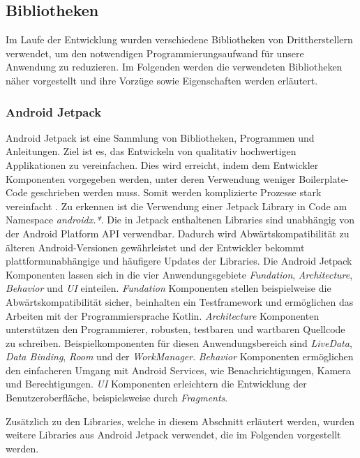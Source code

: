 \documentclass[a4paper]{article}
\begin{document}
\subsection{Bibliotheken}
\label{subsec:technologies:bibs}
Im Laufe der Entwicklung wurden verschiedene Bibliotheken von Drittherstellern verwendet, um den notwendigen Programmierungsaufwand für unsere Anwendung zu reduzieren.
Im Folgenden werden die verwendeten Bibliotheken näher vorgestellt und ihre Vorzüge sowie Eigenschaften werden erläutert.


\subsubsection{Android Jetpack}
\label{subsubsec:technologies:bibs:jetpack}
Android Jetpack ist eine Sammlung von Bibliotheken, Programmen und Anleitungen. Ziel ist es, das Entwickeln von qualitativ hochwertigen Applikationen zu vereinfachen. Dies wird erreicht, indem dem Entwickler Komponenten vorgegeben werden, unter deren Verwendung weniger Boilerplate-Code geschrieben werden muss. Somit werden komplizierte Prozesse stark vereinfacht \autocite{android_jetpack}. Zu erkennen ist die Verwendung einer Jetpack Library in Code am Namespace \textit{androidx.*}. Die in Jetpack enthaltenen Libraries sind unabhängig von der Android Platform API verwendbar. Dadurch wird Abwärtskompatibilität zu älteren Android-Versionen gewährleistet und der Entwickler bekommt plattformunabhängige und häufigere Updates der Libraries. Die Android Jetpack Komponenten lassen sich in die vier Anwendungsgebiete \textit{Fundation}, \textit{Architecture}, \textit{Behavior} und \textit{UI} einteilen. \textit{Fundation} Komponenten stellen beispielweise die Abwärtskompatibilität sicher, beinhalten ein Testframework und ermöglichen das Arbeiten mit der Programmiersprache Kotlin. \textit{Architecture} Komponenten unterstützen den Programmierer, robusten, testbaren und wartbaren Quellcode zu schreiben. Beispielkomponenten für diesen Anwendungsbereich sind \textit{LiveData}, \textit{Data Binding}, \textit{Room} und der \textit{WorkManager}. \textit{Behavior} Komponenten ermöglichen den einfacheren Umgang mit Android Services, wie Benachrichtigungen, Kamera und Berechtigungen. \textit{UI} Komponenten erleichtern die Entwicklung der Benutzeroberfläche, beispielsweise durch \textit{Fragments}.

Zusätzlich zu den Libraries, welche in diesem Abschnitt erläutert werden, wurden weitere Libraries aus Android Jetpack verwendet, die im Folgenden vorgestellt werden.
\end{document}
